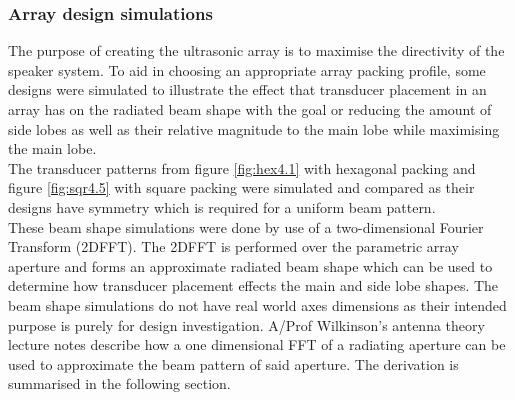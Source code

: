 \newpage


\subsubsection{Array design simulations}
The purpose of creating the ultrasonic array is to maximise the directivity of the speaker system. To aid in choosing an appropriate array packing profile, some designs were simulated to illustrate the effect that transducer placement in an array has on the radiated beam shape with the goal or reducing the amount of side lobes as well as their relative magnitude to the main lobe while maximising the main lobe.\\
The transducer patterns from figure \ref{fig:hex4.1} with hexagonal packing and figure \ref{fig:sqr4.5} with square packing were simulated and compared as their designs have symmetry which is required for a uniform beam pattern.\\

These beam shape simulations were done by use of a two-dimensional Fourier Transform (2DFFT). The 2DFFT is performed over the parametric array aperture and forms an approximate radiated beam shape which can be used to determine how transducer placement effects the main and side lobe shapes. The beam shape simulations do not have real world axes dimensions as their intended purpose is purely for design investigation.
A/Prof Wilkinson's antenna theory lecture notes \cite{wilkinson_2017} describe how a one dimensional FFT of a radiating aperture can be used to approximate the beam pattern of said aperture. The derivation is summarised in the following section.
